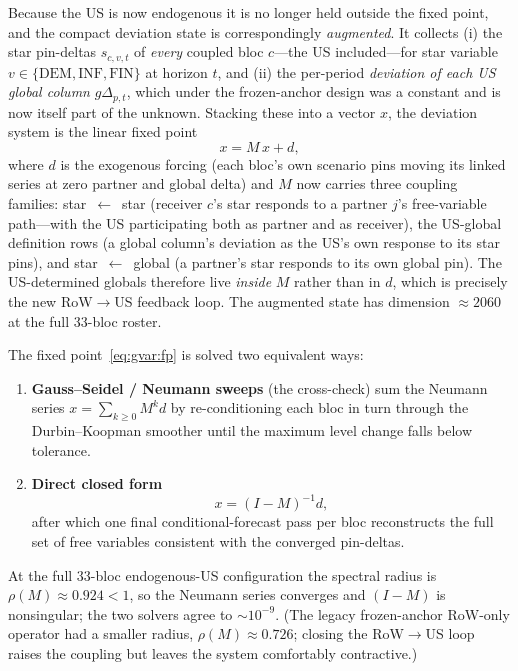 \documentclass[11pt]{article}
\theoremstyle{definition}
\theoremstyle{remark}
\begin{document}
Because the US is now endogenous it is no longer held outside the fixed point,
and the compact deviation state is correspondingly \emph{augmented}. It collects
(i) the star pin-deltas $s_{c,v,t}$ of \emph{every} coupled bloc $c$---the US
included---for star variable $v\in\{\text{DEM},\text{INF},\text{FIN}\}$ at
horizon $t$, and (ii) the per-period \emph{deviation of each US global column}
$g\Delta_{p,t}$, which under the frozen-anchor design was a constant and is now
itself part of the unknown. Stacking these into a vector $x$, the deviation
system is the linear fixed point
\begin{equation}\label{eq:gvar:fp}
  x = M\,x + d,
\end{equation}
where $d$ is the exogenous forcing (each bloc's own scenario pins moving its
linked series at zero partner and global delta) and $M$ now carries three
coupling families: star~$\leftarrow$~star (receiver $c$'s star responds to a
partner $j$'s free-variable path---with the US participating both as partner and
as receiver), the US-global definition rows (a global column's deviation as the
US's own response to its star pins), and star~$\leftarrow$~global (a partner's
star responds to its own global pin). The US-determined globals therefore live
\emph{inside} $M$ rather than in $d$, which is precisely the new RoW$\to$US
feedback loop. The augmented state has dimension $\approx 2060$ at the full
$33$-bloc roster.

The fixed point~\eqref{eq:gvar:fp} is solved two equivalent ways:
\begin{enumerate}[label=(\alph*)]
  \item \textbf{Gauss--Seidel / Neumann sweeps} (the cross-check) sum the
    Neumann series $x = \sum_{k\ge 0} M^k d$ by re-conditioning each bloc in turn
    through the Durbin--Koopman smoother \citep{DurbinKoopman2002,
    DurbinKoopman2012} until the maximum level change falls below tolerance.
  \item \textbf{Direct closed form}
    \begin{equation}\label{eq:gvar:closed}
      x = (I - M)^{-1} d,
    \end{equation}
    after which one final conditional-forecast pass per bloc reconstructs the
    full set of free variables consistent with the converged pin-deltas.
\end{enumerate}
At the full $33$-bloc endogenous-US configuration the spectral radius is
$\rho(M)\approx 0.924 < 1$, so the Neumann series converges and $(I-M)$ is
nonsingular; the two solvers agree to $\sim 10^{-9}$. (The legacy frozen-anchor
RoW-only operator had a smaller radius, $\rho(M)\approx 0.726$; closing the
RoW$\to$US loop raises the coupling but leaves the system comfortably
contractive.)
\end{document}
